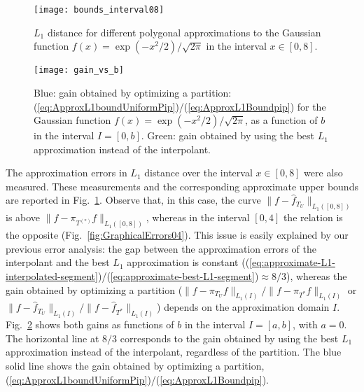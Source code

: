 \documentclass[a4paper,english]{IEEEtran}
\begin{document}
\begin{figure}[t]
\begin{centering}
\texttt{[image: bounds\_interval08]}
\par\end{centering}

\caption{\label{fig:GraphicalErrors08}${L_{1}}$ distance for different polygonal
approximations to the Gaussian function $f(x)=\exp(-x^{2}/2)/\sqrt{2\pi}$
in the interval $x\in[0,8].$}
\end{figure}
\begin{figure}[t]
\begin{centering}
\texttt{[image: gain\_vs\_b]}
\par\end{centering}

\caption{\label{fig:Gain3to8}Blue: gain obtained by optimizing a partition:
(\ref{eq:ApproxL1boundUniformPip})/(\ref{eq:ApproxL1Boundpip}) for
the Gaussian function $f(x)=\exp(-x^{2}/2)/\sqrt{2\pi}$, as a function
of $b$ in the interval $I=[0,b]$. Green: gain obtained by using
the best ${L_{1}}$ approximation instead of the interpolant.}
\end{figure}
The approximation errors in ${L_{1}}$ distance over the interval $x\in[0,8]$
were also measured. These measurements and the corresponding approximate
upper bounds are reported in Fig.~\ref{fig:GraphicalErrors08}. Observe
that, in this case, the curve $\|{f}-{\hat{f}}_{{T}_{U}}\|_{{L_{1}}([0,8])}$
is above $\|{f}-{\pi_{{T}^{(\ast)}}}{f}\|_{{L_{1}}([0,8])}$, whereas in the interval
$[0,4]$ the relation is the opposite (Fig.~\ref{fig:GraphicalErrors04}).
This issue is easily explained by our previous error analysis: the
gap between the approximation errors of the interpolant and the best
${L_{1}}$ approximation is constant ((\ref{eq:approximate-L1-interpolated-segment})/(\ref{eq:approximate-best-L1-segment})$\approx8/3$),
whereas the gain obtained by optimizing a partition ($\|{f}-{\pi_{{T}_{U}}} f\|_{{L_{1}}(I)}/\|{f}-{\pi_{{T}^{\ast}}} f\|_{{L_{1}}(I)}$
or $\|{f}-{\hat{f}}_{{T}_{U}}\|_{{L_{1}}(I)}/\|{f}-{\hat{f}}_{{T}^{\ast}}\|_{{L_{1}}(I)}$)
depends on the approximation domain $I$. Fig.~\ref{fig:Gain3to8}
shows both gains as functions of $b$ in the interval $I=[a,b]$,
with $a=0$. The horizontal line at $8/3$ corresponds to the gain
obtained by using the best ${L_{1}}$ approximation instead of the interpolant,
regardless of the partition. The blue solid line shows the gain obtained
by optimizing a partition, (\ref{eq:ApproxL1boundUniformPip})/(\ref{eq:ApproxL1Boundpip}).
\end{document}

